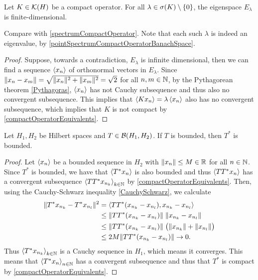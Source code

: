 \begin{lemma}
Let $K\in\operatorname{\mathcal{K}}(H)$ be a compact operator. For all $\lambda\in\sigma(K)\setminus\{0\}$, the eigenspace $E_\lambda$ is finite-dimensional.
\end{lemma}
Compare with \ref{spectrumCompactOperator}. Note that each such $\lambda$ is indeed an eigenvalue, by \ref{pointSpectrumCompactOperatorBanachSpace}.
\begin{proof}
Suppose, towards a contradiction, $E_\lambda$ is infinite dimensional, then we can find a sequence $\left\langle x_n \right\rangle$ of orthonormal vectors in $E_\lambda$. Since $\lVert x_n-x_m\rVert = \sqrt{\lVert x_n\rVert^2+\lVert x_m\rVert^2} = \sqrt{2}$ for all $n,m\in\mathbb{N}$, by the Pythagorean theorem \ref{Pythagoras}, $\left\langle x_n \right\rangle$ has not Cauchy subsequence and thus also no convergent subsequence. This implies that $\left\langle Kx_n \right\rangle = \lambda\left\langle x_n \right\rangle$ also has no convergent subsequence, which implies that $K$ is not compact by \ref{compactOperatorEquivalents}.
\end{proof}

\begin{proposition}
Let $H_1,H_2$ be Hilbert spaces and $T\in \operatorname{\mathcal{B}}(H_1,H_2)$. If $T$ is bounded, then $T^*$ is bounded.
\end{proposition}
\begin{proof}
Let $\left\langle x_n \right\rangle$ be a bounded sequence in $H_2$ with $\lVert x_n\rVert\leq M\in \mathbb{R}$ for all $n\in\mathbb{N}$. Since $T^*$ is bounded, we have that $\left\langle T^*x_n \right\rangle$ is also bounded and thus $\left\langle TT^*x_n \right\rangle$ has a convergent subsequence $\left\langle TT^*x_{n_k} \right\rangle_{k\in \mathbb{N}}$ by \ref{compactOperatorEquivalents}. Then, using the Cauchy-Schwarz inequality \ref{CauchySchwarz}, we calculate
\begin{align*}
\lVert T^*x_{n_k} - T^*x_{n_l}\rVert^2 &= \left\langle TT^*(x_{n_k} - x_{n_l}), x_{n_k} - x_{n_l} \right\rangle \\
&\leq \lVert TT^*(x_{n_k} - x_{n_l})\rVert\;\lVert x_{n_k} - x_{n_l}\rVert \\
&\leq \lVert TT^*(x_{n_k} - x_{n_l})\rVert\;\big(\lVert x_{n_k}\rVert +\lVert x_{n_l}\rVert\big) \\
&\leq 2M\lVert TT^*(x_{n_k} - x_{n_l})\rVert \to 0.
\end{align*}
Thus $\left\langle T^*x_{n_k} \right\rangle_{k\in\mathbb{N}}$ is a Cauchy sequence in $H_1$, which means it converges. This means that $\left\langle T^*x_n \right\rangle_{n\in\mathbb{N}}$ has a convergent subsequence and thus that $T^*$ is compact by \ref{compactOperatorEquivalents}.
\end{proof}


